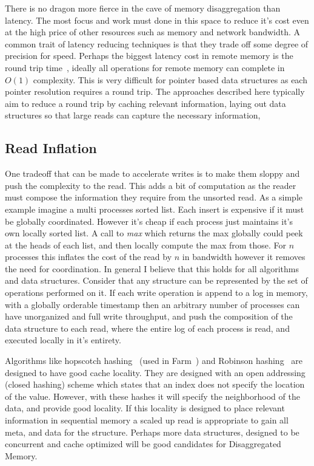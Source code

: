 There is no dragon more fierce in the cave of memory disaggregation than
latency. The most focus and work must done in this space to reduce it's cost
even at the high price of other resources such as memory and network bandwidth.
A common trait of latency reducing techniques is that they trade off some degree
of precision for speed. Perhaps the biggest latency cost in remote memory is the
round trip time~\cite{design-far-memory-struct}, ideally all operations for
remote memory can complete in $O(1)$ complexity. This is very difficult for
pointer based data structures as each pointer resolution requires a round trip.
The approaches described here typically aim to reduce a round trip by caching
relevant information, laying out data structures so that large reads can capture
the necessary information, 


\subsection{Read Inflation} 
\label{sec:readsize}
One tradeoff that can be made to accelerate writes is to make
them sloppy and push the complexity to the read. This adds a bit of computation
as the reader must compose the information they require from the unsorted read.
As a simple example imagine a multi processes sorted list. Each insert is
expensive if it must be globally coordinated. However it's cheap if each process
just maintains it's own locally sorted list. A call to \textit{max} which
returns the max globally could peek at the heads of each list, and then locally
compute the max from those. For $n$ processes this inflates the cost of the read
by $n$ in bandwidth however it removes the need for coordination. In general I
believe that this holds for all algorithms and data structures. Consider that any
structure can be represented by the set of operations performed on it. If each
write operation is append to a log in memory, with a globally orderable
timestamp then an arbitrary number of processes can have unorganized and full
write throughput, and push the composition of the data structure to each read,
where the entire log of each process is read, and executed locally in it's
entirety.

Algorithms like hopscotch hashing~\cite{hopscotch} (used in Farm~\cite{farm})
and Robinson hashing~\cite{robinhood} are designed to have good cache locality.
They are designed with an open addressing (closed hashing) scheme which states
that an index does not specify the location of the value. However, with these
hashes it will specify the neighborhood of the data, and provide good locality.
If this locality is designed to place relevant information in sequential memory
a scaled up read is appropriate to gain all meta, and data for the structure.
Perhaps more data structures, designed to be concurrent and cache optimized will
be good candidates for Disaggregated Memory.

